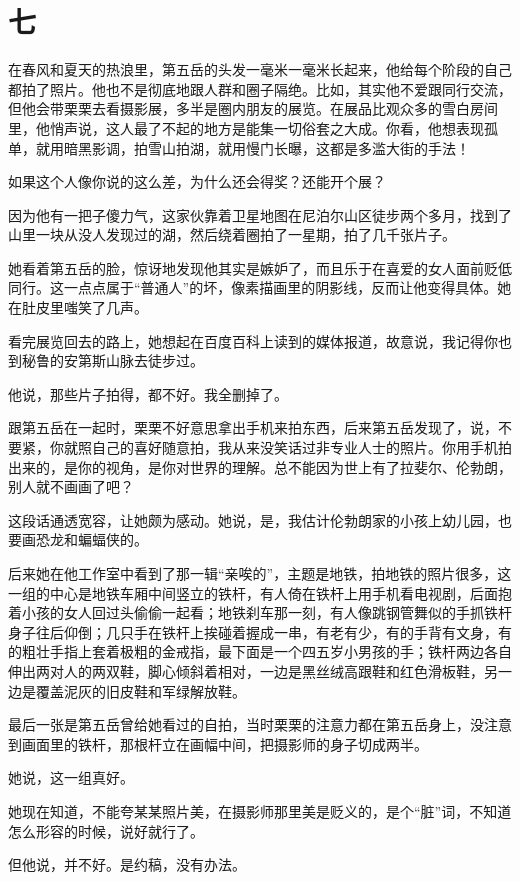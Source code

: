 \documentclass[lang=cn,newtx,12pt,scheme=chinese]{elegantbook}
\begin{document}
\section{七}
在春风和夏天的热浪里，第五岳的头发一毫米一毫米长起来，他给每个阶段的自己都拍了照片。他也不是彻底地跟人群和圈子隔绝。比如，其实他不爱跟同行交流，但他会带栗栗去看摄影展，多半是圈内朋友的展览。在展品比观众多的雪白房间里，他悄声说，这人最了不起的地方是能集一切俗套之大成。你看，他想表现孤单，就用暗黑影调，拍雪山拍湖，就用慢门长曝，这都是多滥大街的手法！

如果这个人像你说的这么差，为什么还会得奖？还能开个展？

因为他有一把子傻力气，这家伙靠着卫星地图在尼泊尔山区徒步两个多月，找到了山里一块从没人发现过的湖，然后绕着圈拍了一星期，拍了几千张片子。

她看着第五岳的脸，惊讶地发现他其实是嫉妒了，而且乐于在喜爱的女人面前贬低同行。这一点点属于“普通人”的坏，像素描画里的阴影线，反而让他变得具体。她在肚皮里嗤笑了几声。

看完展览回去的路上，她想起在百度百科上读到的媒体报道，故意说，我记得你也到秘鲁的安第斯山脉去徒步过。

他说，那些片子拍得，都不好。我全删掉了。

跟第五岳在一起时，栗栗不好意思拿出手机来拍东西，后来第五岳发现了，说，不要紧，你就照自己的喜好随意拍，我从来没笑话过非专业人士的照片。你用手机拍出来的，是你的视角，是你对世界的理解。总不能因为世上有了拉斐尔、伦勃朗，别人就不画画了吧？

这段话通透宽容，让她颇为感动。她说，是，我估计伦勃朗家的小孩上幼儿园，也要画恐龙和蝙蝠侠的。

后来她在他工作室中看到了那一辑“亲唉的”，主题是地铁，拍地铁的照片很多，这一组的中心是地铁车厢中间竖立的铁杆，有人倚在铁杆上用手机看电视剧，后面抱着小孩的女人回过头偷偷一起看；地铁刹车那一刻，有人像跳钢管舞似的手抓铁杆身子往后仰倒；几只手在铁杆上挨碰着握成一串，有老有少，有的手背有文身，有的粗壮手指上套着极粗的金戒指，最下面是一个四五岁小男孩的手；铁杆两边各自伸出两对人的两双鞋，脚心倾斜着相对，一边是黑丝绒高跟鞋和红色滑板鞋，另一边是覆盖泥灰的旧皮鞋和军绿解放鞋。

最后一张是第五岳曾给她看过的自拍，当时栗栗的注意力都在第五岳身上，没注意到画面里的铁杆，那根杆立在画幅中间，把摄影师的身子切成两半。

她说，这一组真好。

她现在知道，不能夸某某照片美，在摄影师那里美是贬义的，是个“脏”词，不知道怎么形容的时候，说好就行了。

但他说，并不好。是约稿，没有办法。
\end{document}
